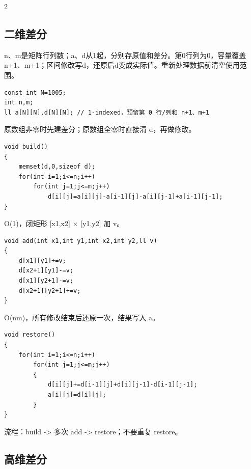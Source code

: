 \documentclass[UTF8,fontset=fandol,a4paper,twoside]{ctexart}
\newcommand{\note}[1]{{\fontsize{10}{12}\selectfont #1\par}}
\begin{document}
\begin{multicols}{2}
\subsection{二维差分}

\note{n、m是矩阵行列数；a、d从1起，分别存原值和差分。第0行列为0，容量覆盖n+\allowbreak{}1、m+\allowbreak{}1；区间修改写d，还原后d变成实际值。重新处理数据前清空使用范围。}
\begin{lstlisting}
const int N=1005;
int n,m;
ll a[N][N],d[N][N]; // 1-indexed，预留第 0 行/列和 n+1、m+1
\end{lstlisting}
\note{原数组非零时先建差分；原数组全零时直接清 d，再做修改。}
\begin{lstlisting}
void build()
{
    memset(d,0,sizeof d);
    for(int i=1;i<=n;i++)
        for(int j=1;j<=m;j++)
            d[i][j]=a[i][j]-a[i-1][j]-a[i][j-1]+a[i-1][j-1];
}
\end{lstlisting}
\note{O(\allowbreak{}1)\allowbreak{}，闭矩形 [\allowbreak{}x1,\allowbreak{}x2]\allowbreak{} \ensuremath{\times} [\allowbreak{}y1,\allowbreak{}y2]\allowbreak{} 加 v。}
\begin{lstlisting}
void add(int x1,int y1,int x2,int y2,ll v)
{
    d[x1][y1]+=v;
    d[x2+1][y1]-=v;
    d[x1][y2+1]-=v;
    d[x2+1][y2+1]+=v;
}
\end{lstlisting}
\note{O(\allowbreak{}nm)\allowbreak{}，所有修改结束后还原一次，结果写入 a。}
\begin{lstlisting}
void restore()
{
    for(int i=1;i<=n;i++)
        for(int j=1;j<=m;j++)
        {
            d[i][j]+=d[i-1][j]+d[i][j-1]-d[i-1][j-1];
            a[i][j]=d[i][j];
        }
}
\end{lstlisting}
\note{流程：build -\allowbreak{}>\allowbreak{} 多次 add -\allowbreak{}>\allowbreak{} restore；不要重复 restore。}
\subsection{高维差分}


\end{multicols}
\end{document}
